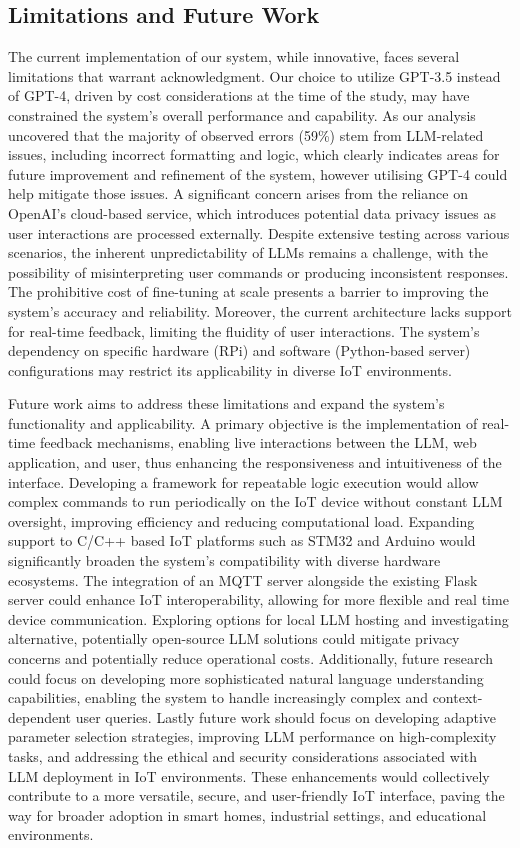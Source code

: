 \documentclass{ieeeaccess}
\begin{document}
\subsection{Limitations and Future Work}
The current implementation of our system, while innovative, faces several limitations that warrant acknowledgment. Our choice to utilize GPT-3.5 instead of GPT-4, driven by cost considerations at the time of the study, may have constrained the system's overall performance and capability. As our analysis uncovered that the majority of observed errors (59\%) stem from LLM-related issues, including incorrect formatting and logic, which clearly indicates areas for future improvement and refinement of the system, however utilising GPT-4 could help mitigate those issues. A significant concern arises from the reliance on OpenAI's cloud-based service, which introduces potential data privacy issues as user interactions are processed externally. Despite extensive testing across various scenarios, the inherent unpredictability of LLMs remains a challenge, with the possibility of misinterpreting user commands or producing inconsistent responses. The prohibitive cost of fine-tuning at scale presents a barrier to improving the system's accuracy and reliability. Moreover, the current architecture lacks support for real-time feedback, limiting the fluidity of user interactions. The system's dependency on specific hardware (RPi) and software (Python-based server) configurations may restrict its applicability in diverse IoT environments.

Future work aims to address these limitations and expand the system's functionality and applicability. A primary objective is the implementation of real-time feedback mechanisms, enabling live interactions between the LLM, web application, and user, thus enhancing the responsiveness and intuitiveness of the interface. Developing a framework for repeatable logic execution would allow complex commands to run periodically on the IoT device without constant LLM oversight, improving efficiency and reducing computational load. Expanding support to C/C++ based IoT platforms such as STM32 and Arduino would significantly broaden the system's compatibility with diverse hardware ecosystems. The integration of an MQTT server alongside the existing Flask server could enhance IoT interoperability, allowing for more flexible and real time device communication. Exploring options for local LLM hosting and investigating alternative, potentially open-source LLM solutions could mitigate privacy concerns and potentially reduce operational costs. Additionally, future research could focus on developing more sophisticated natural language understanding capabilities, enabling the system to handle increasingly complex and context-dependent user queries. Lastly future work should focus on developing adaptive parameter selection strategies, improving LLM performance on high-complexity tasks, and addressing the ethical and security considerations associated with LLM deployment in IoT environments. These enhancements would collectively contribute to a more versatile, secure, and user-friendly IoT interface, paving the way for broader adoption in smart homes, industrial settings, and educational environments. 
\end{document}
